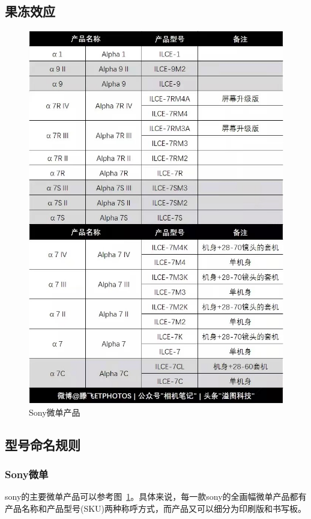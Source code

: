 \documentclass{ctexart}
\begin{document}
\subsection{果冻效应}


\begin{figure}[h!]
    \centering
    \label{fig_sony_products}
    \includegraphics[width=.7\linewidth]{imgs/sony_product.jpeg}
    \caption{Sony微单产品}
\end{figure}

\subsection{型号命名规则}

\subsubsection{Sony微单~\cite{sony_products_analysis}}
sony的主要微单产品可以参考图~\ref{fig_sony_products}。具体来说，每一款sony的全画幅微单产品都有产品名称和产品型号(SKU)两种称呼方式，而产品又可以细分为印刷版和书写板。
\end{document}
